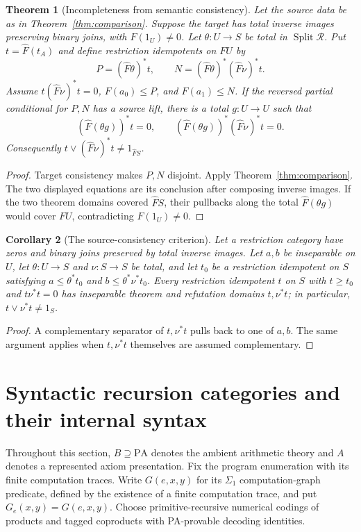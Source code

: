 \documentclass[11pt]{article}
\newtheorem{theorem}{Theorem}[section]
\newtheorem{corollary}[theorem]{Corollary}
\theoremstyle{definition}\newtheorem{definition}[theorem]{Definition}
\newcommand{\PA}{\mathrm{PA}}
\newcommand{\Split}{\operatorname{Split}}
\newcommand{\R}{\mathscr R}
\begin{document}
\begin{theorem}[Incompleteness from semantic consistency]\label{thm:logical}
Let the source data be as in Theorem~\ref{thm:comparison}. Suppose the
target has total inverse images preserving binary joins, with
$F(1_U)\ne0$. Let $\theta:U\to S$ be total in $\Split\R$.
Put $t=\widehat F(t_A)$ and define restriction idempotents on $FU$ by
\[
 P=(\widehat F\theta)^*t,\qquad
 N=(\widehat F\theta)^*(\widehat F\nu)^*t.
\]
Assume $t(\widehat F\nu)^*t=0$, $F(a_0)\le P$, and
$F(a_1)\le N$. If the reversed partial conditional for $P,N$
has a source lift, there is a total $g:U\to U$ such that
\[
 (\widehat F(\theta g))^*t=0,\qquad
 (\widehat F(\theta g))^*(\widehat F\nu)^*t=0.
\]
Consequently $t\vee(\widehat F\nu)^*t\ne1_{\widehat F S}$.
\end{theorem}
\begin{proof}
Target consistency makes $P,N$ disjoint. Apply
Theorem~\ref{thm:comparison}. The two displayed equations are
its conclusion after composing inverse images. If the two theorem
domains covered $\widehat F S$, their pullbacks along the total
$\widehat F(\theta g)$ would cover $FU$, contradicting
$F(1_U)\ne0$.
\end{proof}

\begin{corollary}[The source-consistency criterion]\label{cor:source-logical}
Let a restriction category have zeros and binary joins preserved by
total inverse images. Let $a,b$ be inseparable on $U$, let
$\theta:U\to S$ and $\nu:S\to S$ be total, and let $t_0$ be a
restriction idempotent on $S$ satisfying
$a\le\theta^*t_0$ and $b\le\theta^*\nu^*t_0$.
Every restriction idempotent $t$ on $S$ with $t\ge t_0$
and $t\nu^*t=0$ has inseparable theorem and refutation domains
$t,\nu^*t$; in particular, $t\vee\nu^*t\ne1_S$.
\end{corollary}
\begin{proof}
A complementary separator of $t,\nu^*t$ pulls back to one of
$a,b$. The same argument applies when $t,\nu^*t$ themselves are
assumed complementary.
\end{proof}

\section{Syntactic recursion categories and their internal syntax}
Throughout this section, $B\supseteq\PA$ denotes the ambient
arithmetic theory and $A$ denotes a represented axiom presentation.
Fix the program enumeration with its finite computation traces.
Write $G(e,x,y)$ for its $\Sigma_1$ computation-graph predicate,
defined by the existence of a finite computation trace, and put
$G_e(x,y)=G(e,x,y)$. Choose primitive-recursive numerical codings
of products and tagged coproducts with PA-provable decoding identities.
\end{document}
